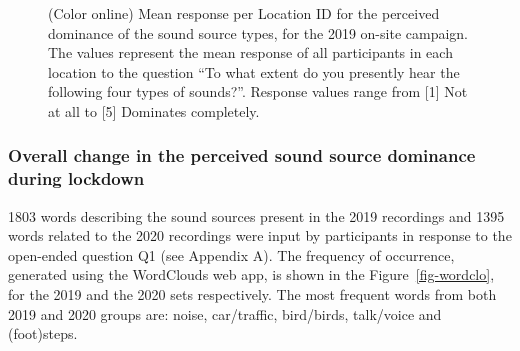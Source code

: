 \documentclass[
  authoryear,
  preprint,
  3p,
  onecolumn]{elsarticle}
\begin{document}
\begin{figure}


\caption{\label{fig-barchart}(Color online) Mean response per Location
ID for the perceived dominance of the sound source types, for the 2019
on-site campaign. The values represent the mean response of all
participants in each location to the question ``To what extent do you
presently hear the following four types of sounds?''. Response values
range from {[}1{]} Not at all to {[}5{]} Dominates completely.}

\end{figure}%

\subsubsection{Overall change in the perceived sound source dominance
during
lockdown}\label{overall-change-in-the-perceived-sound-source-dominance-during-lockdown}

1803 words describing the sound sources present in the 2019 recordings
and 1395 words related to the 2020 recordings were input by participants
in response to the open-ended question Q1 (see Appendix A). The
frequency of occurrence, generated using the WordClouds web app, is
shown in the Figure~\ref{fig-wordclo}, for the 2019 and the 2020 sets
respectively. The most frequent words from both 2019 and 2020 groups
are: noise, car/traffic, bird/birds, talk/voice and (foot)steps.
\end{document}
